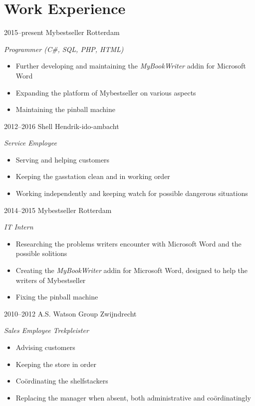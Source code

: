 \documentclass[]{friggeri-cv} %
\begin{document}
\clearpage

\section{Work Experience}

\begin{entrylist}
   \entry
   {2015--present}
   {Mybestseller}
   {Rotterdam}
   {\emph{Programmer (C\#, SQL, PHP, HTML)}
      \begin{itemize}
         \item Further developing and maintaining the \textit{MyBookWriter} addin for Microsoft Word
         \item Expanding the platform of Mybestseller on various aspects
         \item Maintaining the pinball machine
      \end{itemize}
   }
   \entry
   {2012--2016}
   {Shell}
   {Hendrik-ido-ambacht}
   {\emph{Service Employee}
      \begin{itemize}
         \item Serving and helping customers
         \item Keeping the gasstation clean and in working order
         \item Working independently and keeping watch for possible dangerous situations
      \end{itemize}
   }
   \entry
   {2014--2015}
   {Mybestseller}
   {Rotterdam}
   {\emph{IT Intern}
      \begin{itemize}
         \item Researching the problems writers encounter with Microsoft Word and the possible solitions
         \item Creating the \textit{MyBookWriter} addin for Microsoft Word, designed to help the writers of Mybestseller
         \item Fixing the pinball machine
      \end{itemize}
   }
   \entry
   {2010--2012}
   {A.S. Watson Group}
   {Zwijndrecht}
   {\emph{Sales Employee Trekpleister}
      \begin{itemize}
         \item Advising customers
         \item Keeping the store in order
         \item Co\"ordinating the shelfstackers
         \item Replacing the manager when absent, both administrative and co\"ordinatingly
      \end{itemize}
   }
\end{entrylist}
\end{document}
